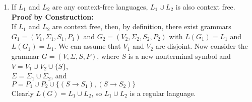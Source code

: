 \documentclass[a4paper, 12pt]{article}
\begin{document}
\begin{enumerate}
\begin{itemize}
\begin{figure}[H]
\end{figure}
\end{itemize}

\newpage
\item
If $L_1$ and $L_2$ are any context-free languages, $L_1 \cup L_2$ is also context free.\\
\textbf{Proof by Construction:}\\
If $L_1$ and $L_2$ are context free, then, by definition, there exist grammars $G_1 = (V_1, \Sigma_1, S_1, P_1)$ and $G_2 = (V_2, \Sigma_2, S_2, P_2)$ with $L(G_1) = L_1$ and $L(G_1) = L_1$. We can assume that $V_1$ and $V_2$ are disjoint. Now consider the grammar $G = (V, \Sigma, S, P)$, where $S$ is a new nonterminal symbol and\\
\indent
$V = V_1 \cup V_2 \cup \{S\}$,\\
$\Sigma = \Sigma_1 \cup \Sigma_2$, and\\
$P = P_1 \cup P_2 \cup \{(S \rightarrow S_1), (S \rightarrow S_2)\}$\\

Clearly $L(G) = L_1 \cup L_2$, so $L_1 \cup L_2$ is a regular language.


\end{enumerate}
\end{document}
